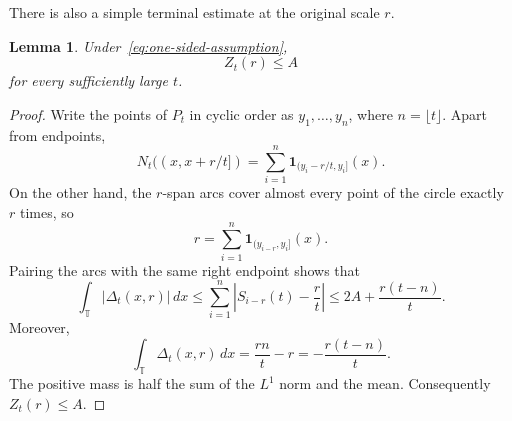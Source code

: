 \documentclass[11pt]{article}
\newtheorem{lemma}[theorem]{Lemma}
\theoremstyle{remark}
\numberwithin{equation}{section}
\newcommand{\T}{\mathbb{T}}
\begin{document}
There is also a simple terminal estimate at the original scale $r$.
\begin{lemma}\label{lem:l1-terminal}
Under~\eqref{eq:one-sided-assumption},
\[
  Z_t(r)\leq A
\]
for every sufficiently large $t$.
\end{lemma}
\begin{proof}
Write the points of $P_t$ in cyclic order as $y_1,\ldots,y_n$, where
$n=\lfloor t\rfloor$. Apart from endpoints,
\[
  N_t((x,x+r/t])
  =\sum_{i=1}^n\mathbf 1_{(y_i-r/t,y_i]}(x).
\]
On the other hand, the $r$-span arcs cover almost every point of the
circle exactly $r$ times, so
\[
  r=\sum_{i=1}^n\mathbf 1_{(y_{i-r},y_i]}(x).
\]
Pairing the arcs with the same right endpoint shows that
\[
  \int_{\T}|\Delta_t(x,r)|\,dx
  \leq\sum_{i=1}^n
  \left|S_{i-r}(t)-\frac rt\right|
  \leq2A+\frac{r(t-n)}t.
\]
Moreover,
\[
  \int_{\T}\Delta_t(x,r)\,dx
  =\frac{rn}{t}-r=-\frac{r(t-n)}t.
\]
The positive mass is half the sum of the $L^1$ norm and the mean.
Consequently $Z_t(r)\leq A$.
\end{proof}
\end{document}
